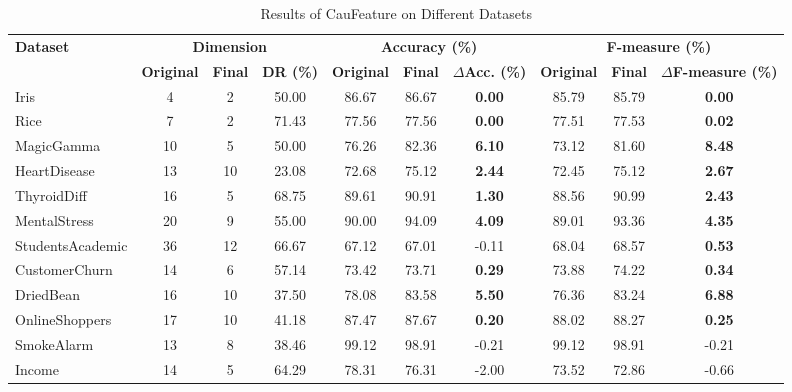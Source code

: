 \documentclass[journal]{IEEEtran}
\begin{document}
\begin{table}[!tbp]
  \setlength{\abovecaptionskip}{0cm}    
  \setlength{\belowcaptionskip}{0.1cm}  
  \centering
  \tiny
  \setlength{\tabcolsep}{4pt}           
  \caption{Results of CauFeature on Different Datasets}
  \label{tab:dataset_results}
  \begin{tabular*}{\textwidth}{l @{\extracolsep{\fill}} ccccccccc}
    \toprule  
    \multirow{2}{*}{\textbf{Dataset}} & 
    \multicolumn{3}{c}{\textbf{Dimension}} & 
    \multicolumn{3}{c}{\textbf{Accuracy (\%)}} & 
    \multicolumn{3}{c}{\textbf{F-measure (\%)}} \\
    \cmidrule(lr){2-4} \cmidrule(lr){5-7} \cmidrule(lr){8-10}  
    & \textbf{Original} & \textbf{Final} & \textbf{DR (\%)} & 
    \textbf{Original} & \textbf{Final} & \textbf{$\Delta$Acc. (\%)} & 
    \textbf{Original} & \textbf{Final} & \textbf{$\Delta$F-measure (\%)} \\
    \midrule  
    Iris              & 4  & 2  & 50.00 & 86.67 & 86.67 & \textbf{0.00} & 85.79 & 85.79 & \textbf{0.00} \\
    Rice              & 7  & 2  & 71.43 & 77.56 & 77.56 & \textbf{0.00} & 77.51 & 77.53 & \textbf{0.02} \\ 
    MagicGamma        & 10 & 5  & 50.00 & 76.26 & 82.36 & \textbf{6.10} & 73.12 & 81.60 & \textbf{8.48} \\
    HeartDisease      & 13 & 10 & 23.08 & 72.68 & 75.12 & \textbf{2.44} & 72.45 & 75.12 & \textbf{2.67} \\
    ThyroidDiff       & 16 & 5  & 68.75 & 89.61 & 90.91 & \textbf{1.30} & 88.56 & 90.99 & \textbf{2.43} \\
    MentalStress      & 20 & 9  & 55.00 & 90.00 & 94.09 & \textbf{4.09} & 89.01 & 93.36 & \textbf{4.35} \\
    StudentsAcademic  & 36 & 12 & 66.67 & 67.12 & 67.01 & -0.11 & 68.04 & 68.57 & \textbf{0.53} \\
    CustomerChurn     & 14 & 6  & 57.14 & 73.42 & 73.71 & \textbf{0.29} & 73.88 & 74.22 & \textbf{0.34} \\
    DriedBean         & 16 & 10 & 37.50 & 78.08 & 83.58 & \textbf{5.50} & 76.36 & 83.24 & \textbf{6.88} \\
    OnlineShoppers    & 17 & 10 & 41.18 & 87.47 & 87.67 & \textbf{0.20} & 88.02 & 88.27 & \textbf{0.25} \\ 
    SmokeAlarm        & 13 & 8  & 38.46 & 99.12 & 98.91 & -0.21 & 99.12 & 98.91 & -0.21 \\
    Income            & 14 & 5  & 64.29 & 78.31 & 76.31 & -2.00 & 73.52 & 72.86 & -0.66 \\  

\end{tabular*}
\end{table}
\end{document}
